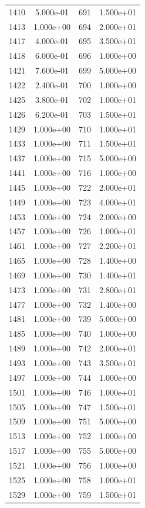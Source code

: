 \documentclass[12pt]{article}
\begin{document}
\begin{longtable}{@{}cccc@{}}
1410 & 5.000e-01 & 691 & 1.500e+01 \\
1413 & 1.000e+00 & 694 & 2.000e+01 \\
1417 & 4.000e-01 & 695 & 3.500e+01 \\
1418 & 6.000e-01 & 696 & 1.000e+00 \\
1421 & 7.600e-01 & 699 & 5.000e+00 \\
1422 & 2.400e-01 & 700 & 1.000e+00 \\
1425 & 3.800e-01 & 702 & 1.000e+01 \\
1426 & 6.200e-01 & 703 & 1.500e+01 \\
1429 & 1.000e+00 & 710 & 1.000e+01 \\
1433 & 1.000e+00 & 711 & 1.500e+01 \\
1437 & 1.000e+00 & 715 & 5.000e+00 \\
1441 & 1.000e+00 & 716 & 1.000e+00 \\
1445 & 1.000e+00 & 722 & 2.000e+01 \\
1449 & 1.000e+00 & 723 & 4.000e+01 \\
1453 & 1.000e+00 & 724 & 2.000e+00 \\
1457 & 1.000e+00 & 726 & 1.000e+01 \\
1461 & 1.000e+00 & 727 & 2.200e+01 \\
1465 & 1.000e+00 & 728 & 1.400e+00 \\
1469 & 1.000e+00 & 730 & 1.400e+01 \\
1473 & 1.000e+00 & 731 & 2.800e+01 \\
1477 & 1.000e+00 & 732 & 1.400e+00 \\
1481 & 1.000e+00 & 739 & 5.000e+00 \\
1485 & 1.000e+00 & 740 & 1.000e+00 \\
1489 & 1.000e+00 & 742 & 2.000e+01 \\
1493 & 1.000e+00 & 743 & 3.500e+01 \\
1497 & 1.000e+00 & 744 & 1.000e+00 \\
1501 & 1.000e+00 & 746 & 1.000e+01 \\
1505 & 1.000e+00 & 747 & 1.500e+01 \\
1509 & 1.000e+00 & 751 & 5.000e+00 \\
1513 & 1.000e+00 & 752 & 1.000e+00 \\
1517 & 1.000e+00 & 755 & 5.000e+00 \\
1521 & 1.000e+00 & 756 & 1.000e+00 \\
1525 & 1.000e+00 & 758 & 1.000e+01 \\
1529 & 1.000e+00 & 759 & 1.500e+01 \\

\end{longtable}
\end{document}
